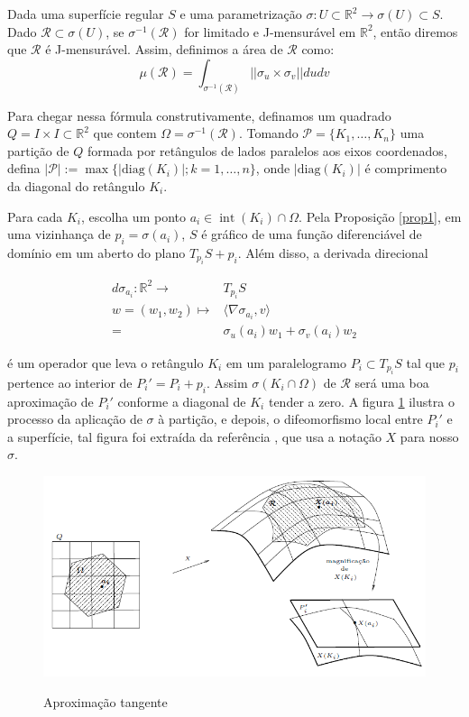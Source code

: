 \documentclass[12pt,letterpaper]{article}
\newcommand\rcur{\mathcal{R}}
\newcommand{\rr}{\mathbb{R}^2}
\newcommand{\op}[1]{\operatorname{#1}}
\begin{document}
		Dada uma superfície regular $S$ e uma parametrização $\sigma:U\subset\rr\to \sigma(U)\subset S$. Dado $\rcur\subset \sigma(U)$, se $\sigma^{-1}(\rcur)$ for limitado e J-mensurável em $\rr$, então diremos que $\rcur$ é J-mensurável. Assim, definimos a área de $\rcur$ como:
		$$\mu(\rcur)=\displaystyle\int_{\sigma^{-1}(\rcur)}||\sigma_u\times\sigma_v||dudv$$
		
		Para chegar nessa fórmula construtivamente, definamos um quadrado $Q=I\times I\subset\rr$ que contem $\Omega=\sigma^{-1}(\rcur)$. Tomando $\mathscr{P}=\{K_1,\ldots,K_n\}$ uma partição de $Q$ formada por retângulos de lados paralelos aos eixos coordenados, defina $|\mathcal{P}|:=\max\{|\text{diag}(K_i)|;k=1,\ldots,n\}$, onde $|\text{diag}(K_i)|$ é comprimento da diagonal do retângulo $K_i$.
	
		Para cada $K_i$, escolha um ponto $a_i\in\op{int}(K_i)\cap \Omega$. Pela Proposição \ref{prop1}, em uma vizinhança de $p_i=\sigma(a_i)$, $S$ é gráfico de uma função diferenciável de domínio em um aberto do plano $T_{p_i}S+p_i$. Além disso, a derivada direcional
		
		\begin{align*}
			d\sigma_{a_i}:\rr\to& T_{p_i}S\\
				w=(w_1,w_2)\mapsto& \langle\nabla\sigma_{a_i},v\rangle\\
				=&\sigma_u(a_i)w_1 + \sigma_v(a_i)w_2
		\end{align*} 
		
		é um operador que leva o retângulo $K_i$ em um paralelogramo $P_i\subset T_{p_i}S$ tal que $p_i$ pertence ao interior de $P_i'=P_i+p_i$. Assim $\sigma(K_i\cap\Omega)$ de $\rcur$ será uma boa aproximação de $P_i'$ conforme a diagonal de $K_i$ tender a zero. A figura \ref{fig1} ilustra o processo da aplicação de $\sigma$ à partição, e depois, o difeomorfismo local entre $P_i'$ e a superfície, tal figura foi extraída da referência \cite{ronaldo}, que usa a notação $X$ para nosso $\sigma$. 
		
		\begin{figure}[!htb]
			\centering
			\includegraphics[scale=0.7]{../images/fff_fig1.png}
			\label{fig1}
			\caption{Aproximação tangente}
		\end{figure}
	
\end{document}
